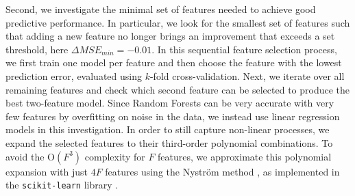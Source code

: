 \newpar Second, we investigate the minimal set of features needed to achieve good predictive performance. In particular, we look for the smallest set of features such that adding a new feature no longer brings an improvement that exceeds a set threshold, here $\Delta MSE_{min} = -0.01$. In this sequential feature selection process, we first train one model per feature and then choose the feature with the lowest prediction error, evaluated using $k$-fold cross-validation. Next, we iterate over all remaining features and check which second feature can be selected to produce the best two-feature model. Since Random Forests can be very accurate with very few features by overfitting on noise in the data, we instead use linear regression models in this investigation. In order to still capture non-linear processes, we expand the selected features to their third-order polynomial combinations. To avoid the $\text{O}(F^3)$ complexity for $F$ features, we approximate this polynomial expansion with just $4F$ features using the Nystr\"om method \cite{nystroem-kernel-2000, nystroem-fourier-2012}, as implemented in the \texttt{scikit-learn} library \cite{scikit-learn-2011}.

